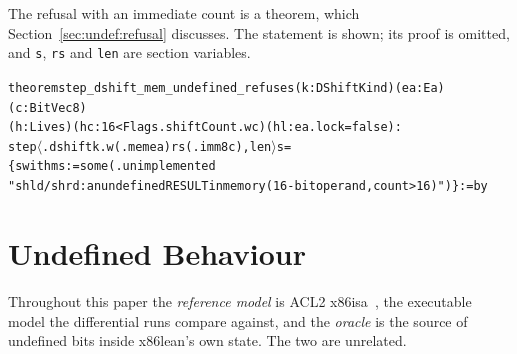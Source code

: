 \documentclass[runningheads]{llncs}
\newcommand{\src}[1]{}  %
\newcommand{\lean}[1]{\texttt{#1}}
\begin{document}
The refusal with an immediate count is a theorem, which Section~\ref{sec:undef:refusal} discusses. The statement is shown; its
proof is omitted, and \lean{s}, \lean{rs} and \lean{len} are section variables.
\src{X86/Theorems.lean step\_dshift\_mem\_undefined\_refuses}

{\scriptsize
\begin{alltt}
theorem step_dshift_mem_undefined_refuses (k : DShiftKind) (ea : Ea) (c : BitVec 8)
    (h : Live s) (hc : 16 < Flags.shiftCount .w c) (hl : ea.lock = false) :
    step \(\langle\).dshift k .w (.mem ea) rs (.imm8 c), len\(\rangle\) s =
      \{ s with ms := some (.unimplemented
          "shld/shrd: an undefined RESULT in memory (16-bit operand, count > 16)") \} := by
\end{alltt}
}

\section{Undefined Behaviour}
\label{sec:undef}

Throughout this paper the \emph{reference model} is ACL2 x86isa~\cite{goel-x86isa,x86isa-repo}, the
executable model the differential runs compare against, and the \emph{oracle} is the source of
undefined bits inside x86lean's own state. The two are unrelated.
\end{document}
